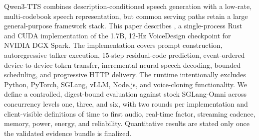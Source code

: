 Qwen3-TTS combines description-conditioned speech generation with a low-rate,
multi-codebook speech representation, but common serving paths retain a large
general-purpose framework stack. This paper describes \projectname{}, a
single-process Rust and CUDA implementation of the 1.7B, 12-Hz VoiceDesign
checkpoint for NVIDIA DGX Spark. The implementation covers prompt
construction, autoregressive talker execution, 15-step residual-code
prediction, event-ordered device-to-device token transfer, incremental neural
speech decoding, bounded scheduling, and progressive HTTP delivery. The
runtime intentionally excludes Python, PyTorch, SGLang, vLLM, Node.js, and
voice-cloning functionality. We define a controlled, digest-bound evaluation
against stock SGLang-Omni across concurrency levels one, three, and six, with
two rounds per implementation and client-visible definitions of time to first
audio, real-time factor, streaming cadence, memory, power, energy, and
reliability.
\ifFinalEvidenceAvailable
  \VerifiedAbstractResult
\else
  Quantitative results are stated only once the validated evidence bundle is
  finalized.
\fi
